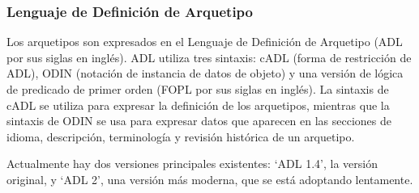 \subsubsection{Lenguaje de Definición de Arquetipo}

Los arquetipos son expresados en el Lenguaje de Definición de Arquetipo \cite{openEHRADL} (ADL por sus siglas en inglés). ADL utiliza tres sintaxis: cADL (forma de restricción de ADL), ODIN (notación de instancia de datos de objeto) y una versión de lógica de predicado de primer orden (FOPL por sus siglas en inglés). La sintaxis de cADL se utiliza para expresar la definición de los arquetipos, mientras que la sintaxis de ODIN se usa para expresar datos que aparecen en las secciones de idioma, descripción, terminología y revisión histórica de un arquetipo.

Actualmente hay dos versiones principales existentes: `ADL 1.4', la versión original, y `ADL 2', una versión más moderna, que se está adoptando lentamente.
